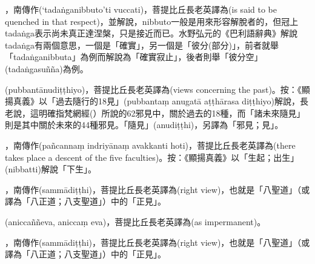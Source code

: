 \startitemgroup[noteitems]
\item{}，南傳作(‘tadaṅganibbuto’ti vuccati)，菩提比丘長老英譯為(is said to be quenched in that respect)，並解說，nibbuto一般是用來形容解脫者的，但冠上tadaṅga表示尚未真正達涅槃，只是接近而已。水野弘元的《巴利語辭典》解說tadaṅga有兩個意思，一個是「確實」，另一個是「彼分(部分)」，前者就舉「tadaṅganibbuta」為例而解說為「確實寂止」，後者則舉「彼分空」(tadaṅgasuñña)為例。
\stopitemgroup

\startitemgroup[noteitems]
\item{}(pubbantānudiṭṭhiyo)，菩提比丘長老英譯為(views concerning the past)。按：《顯揚真義》以「過去隨行的18見」(pubbantaṃ anugatā aṭṭhārasa diṭṭhiyo)解說，長老說，這明確指梵網經(）所說的62邪見中，關於過去的18種，而「諸未來隨見」則是其中關於未來的44種邪見。「隨見」(anudiṭṭhi)，另譯為「邪見；見」。
\stopitemgroup

\startitemgroup[noteitems]
\item{}，南傳作(pañcannaṃ indriyānaṃ avakkanti hoti)，菩提比丘長老英譯為(there takes place a descent of the five faculties)。按：《顯揚真義》以「生起；出生」(nibbatti)解說「下生」。
\stopitemgroup

\startitemgroup[noteitems]
\item{}，南傳作(sammādiṭṭhi)，菩提比丘長老英譯為(right view)，也就是「八聖道」（或譯為「八正道；八支聖道」）中的「正見」。
\stopitemgroup

\startitemgroup[noteitems]
\item{}(aniccaññeva, aniccaṃ eva)，菩提比丘長老英譯為(as impermanent)。
\stopitemgroup

\startitemgroup[noteitems]
\item{}，南傳作(sammādiṭṭhi)，菩提比丘長老英譯為(right view)，也就是「八聖道」（或譯為「八正道；八支聖道」）中的「正見」。
\stopitemgroup

